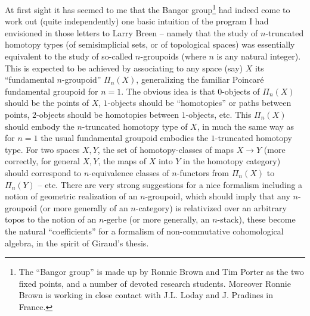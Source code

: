 At first sight it has seemed to me that the Bangor group\footnote{The ``Bangor group'' is made up by Ronnie Brown and Tim Porter as the two fixed points, and a number of devoted research students. Moreover Ronnie Brown is working in close contact with J.L. Loday and J. Pradines in France.} had indeed
come to work out (quite independently) one basic intuition of the
program I had envisioned in those letters to Larry Breen -- namely
that the study of $n$-truncated homotopy types (of semisimplicial
sets, or of topological spaces) was essentially equivalent to the
study of so-called $n$-groupoids (where $n$ is any natural
integer). This is expected to be achieved by associating to any space
(say) $X$ its ``fundamental $n$-groupoid'' $\Pi_n(X)$, generalizing
the familiar Poincar\'e fundamental groupoid for $n=1$. The obvious
idea is that $0$-objects of $\Pi_n(X)$ should be the points of $X$,
$1$-objects should be ``homotopies'' or paths between points,
$2$-objects should be homotopies between $1$-objects, etc. This
$\Pi_n(X)$ should embody the $n$-truncated homotopy type of $X$, in
much the same way as for $n=1$ the usual fundamental groupoid embodies
the $1$-truncated homotopy type. For two spaces $X,Y$, the set of
homotopy-classes of maps $X\to Y$ (more correctly, for general $X,Y$,
the maps of $X$ into $Y$ in the homotopy category) should correspond
to $n$-equivalence classes of $n$-functors from $\Pi_n(X)$ to
$\Pi_n(Y)$ -- etc. There are very strong suggestions for a nice
formalism including a notion of geometric realization of an
$n$-groupoid, which should imply that any $n$-groupoid (or more
generally of an $n$-category) is relativized over an arbitrary topos
to the notion of an $n$-gerbe (or more generally, an $n$-stack), these
become the natural ``coefficients'' for a formalism of non-commutative
cohomological algebra, in the spirit of Giraud's thesis.

